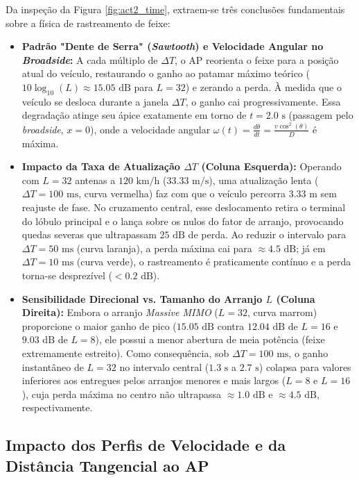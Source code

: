 Da inspeção da Figura \ref{fig:act2_time}, extraem-se três conclusões fundamentais sobre a física de rastreamento de feixe:
\begin{itemize}
    \item \textbf{Padrão "Dente de Serra" (\textit{Sawtooth}) e Velocidade Angular no \textit{Broadside}:} A cada múltiplo de $\Delta T$, o AP reorienta o feixe para a posição atual do veículo, restaurando o ganho ao patamar máximo teórico ($10\log_{10}(L) \approx 15.05\text{ dB}$ para $L=32$) e zerando a perda. À medida que o veículo se desloca durante a janela $\Delta T$, o ganho cai progressivamente. Essa degradação atinge seu ápice exatamente em torno de $t = 2.0\text{ s}$ (passagem pelo \textit{broadside}, $x=0$), onde a velocidade angular $\omega(t) = \frac{d\theta}{dt} = \frac{v \cos^2(\theta)}{D}$ é máxima.
    \item \textbf{Impacto da Taxa de Atualização $\Delta T$ (Coluna Esquerda):} Operando com $L=32$ antenas a $120\text{ km/h}$ ($33.33\text{ m/s}$), uma atualização lenta ($\Delta T = 100\text{ ms}$, curva vermelha) faz com que o veículo percorra $3.33\text{ m}$ sem reajuste de fase. No cruzamento central, esse deslocamento retira o terminal do lóbulo principal e o lança sobre os nulos do fator de arranjo, provocando quedas severas que ultrapassam $25\text{ dB}$ de perda. Ao reduzir o intervalo para $\Delta T = 50\text{ ms}$ (curva laranja), a perda máxima cai para $\approx 4.5\text{ dB}$; já em $\Delta T = 10\text{ ms}$ (curva verde), o rastreamento é praticamente contínuo e a perda torna-se desprezível ($< 0.2\text{ dB}$).
    \item \textbf{Sensibilidade Direcional vs. Tamanho do Arranjo $L$ (Coluna Direita):} Embora o arranjo \textit{Massive MIMO} ($L=32$, curva marrom) proporcione o maior ganho de pico ($15.05\text{ dB}$ contra $12.04\text{ dB}$ de $L=16$ e $9.03\text{ dB}$ de $L=8$), ele possui a menor abertura de meia potência (feixe extremamente estreito). Como consequência, sob $\Delta T = 100\text{ ms}$, o ganho instantâneo de $L=32$ no intervalo central ($1.3\text{ s}$ a $2.7\text{ s}$) colapsa para valores inferiores aos entregues pelos arranjos menores e mais largos ($L=8$ e $L=16$), cuja perda máxima no centro não ultrapassa $\approx 1.0\text{ dB}$ e $\approx 4.5\text{ dB}$, respectivamente.
\end{itemize}

\subsection{Impacto dos Perfis de Velocidade e da Distância Tangencial ao AP}

